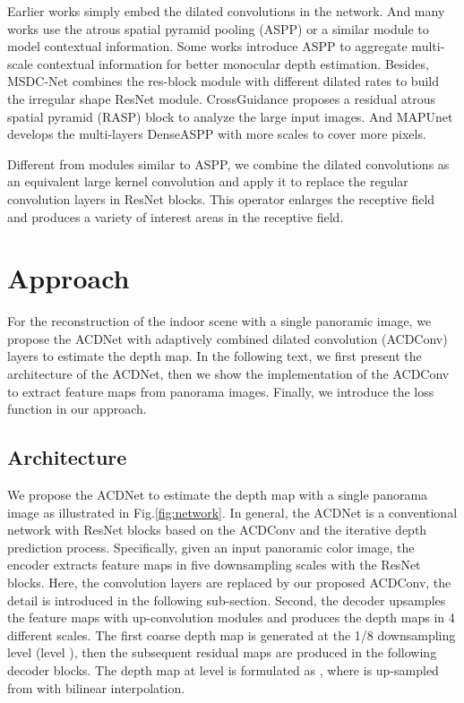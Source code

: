 \documentclass[letterpaper]{article} \usepackage{aaai21}  \usepackage{times}  \usepackage{helvet} \usepackage{courier}  \usepackage[hyphens]{url}  \usepackage{graphicx} \urlstyle{rm} \def\UrlFont{\rm}  \usepackage{natbib}  \usepackage{caption} \frenchspacing  \setlength{\pdfpagewidth}{8.5in}  \setlength{\pdfpageheight}{11in}
\begin{document}
Earlier works \cite{DBLP:conf/cvpr/YuKF17,DBLP:conf/pcm/MaDWZL18} simply embed the dilated convolutions in the network. And many works use the atrous spatial pyramid pooling (ASPP) \cite{DBLP:journals/pami/ChenPKMY18} or a similar module to model contextual information. Some works \cite{DBLP:conf/cvpr/FuGWBT18,DBLP:conf/wacv/FangCCG20,DBLP:conf/eccv/ZhangYWCW20,DBLP:journals/corr/abs-2106-08615} introduce ASPP to aggregate multi-scale contextual information for better monocular depth estimation. Besides, MSDC-Net \cite{DBLP:journals/access/TianZRWHH19} combines the res-block module with different dilated rates to build the irregular shape ResNet \cite{DBLP:conf/cvpr/HeZRS16} module. CrossGuidance \cite{DBLP:journals/access/LeeLKK20} proposes a residual atrous spatial pyramid (RASP) block to analyze the large input images. And MAPUnet \cite{DBLP:journals/access/YangWZZSY21} develops the multi-layers DenseASPP with more scales to cover more pixels. 

Different from modules similar to ASPP, we combine the dilated convolutions as an equivalent large kernel convolution and apply it to replace the regular convolution layers in ResNet blocks. This operator enlarges the receptive field and produces a variety of interest areas in the receptive field.


\section{Approach}

For the reconstruction of the indoor scene with a single panoramic image, we propose the ACDNet with adaptively combined dilated convolution (ACDConv) layers to estimate the depth map.
In the following text, we first present the architecture of the ACDNet, then we show the implementation of the ACDConv to extract feature maps from panorama images. Finally, we introduce the loss function in our approach.

\subsection{Architecture}

We propose the ACDNet to estimate the depth map with a single panorama image as illustrated in Fig.\ref{fig:network}. In general, the ACDNet is a conventional network with ResNet blocks based on the ACDConv and the iterative depth prediction process. Specifically, given an input panoramic color image, the encoder extracts feature maps in five downsampling scales with the ResNet blocks. Here, the  convolution layers are replaced by our proposed ACDConv, the detail is introduced in the following sub-section. Second, the decoder upsamples the feature maps with up-convolution modules \cite{DBLP:conf/3dim/LainaRBTN16} and produces the depth maps in 4 different scales. The first coarse depth map  is generated at the 1/8 downsampling level (level ), then the subsequent residual maps  are produced in the following decoder blocks. The depth map  at level  is formulated as , where  is up-sampled from  with bilinear interpolation.
\end{document}
